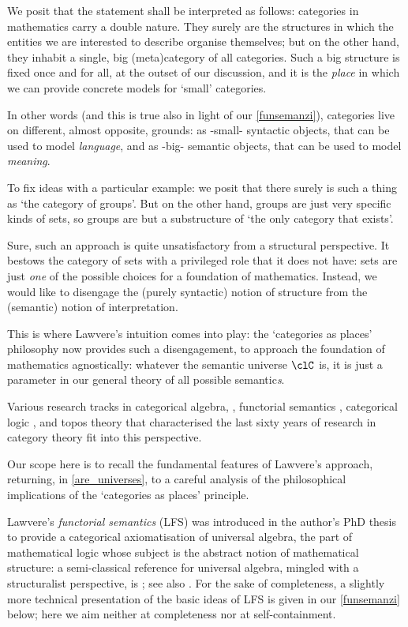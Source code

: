 We posit that the statement shall be interpreted as follows: categories in mathematics carry a double nature. They surely are the structures in which the entities we are interested to describe organise themselves; but on the other hand, they inhabit a single, big (meta)category of all categories. Such a big structure is fixed once and for all, at the outset of our discussion, and it is the \emph{place} in which we can provide concrete models for `small' categories.

In other words (and this is true also in light of our \autoref{funsemanzi}), categories live on different, almost opposite, grounds: as -small- syntactic objects, that can be used to model \emph{language}, and as -big- semantic objects, that can be used to model \emph{meaning}.

To fix ideas with a particular example: we posit that there surely is such a thing as `the category of groups'. But on the other hand, groups are just very specific kinds of sets, so groups are but a substructure of `the only category that exists'.

Sure, such an approach is quite unsatisfactory from a structural perspective. It bestows the category of sets with a privileged role that it does not have: sets are just \emph{one} of the possible choices for a foundation of mathematics. Instead, we would like to disengage the (purely syntactic) notion of structure from the (semantic) notion of interpretation.

This is where Lawvere's intuition comes into play: the `categories as places' philosophy now provides such a disengagement, to approach the foundation of mathematics agnostically: whatever the semantic universe $\clC$ is, it is just a parameter in our general theory of all possible semantic\emph{s}.

Various research tracks in categorical algebra, \cite{Janelidze2004}, functorial semantics \cite{lawvere1963functorial,hyland2007category}, categorical logic \cite{lambek1988introduction}, and topos theory \cite{JohnstonePT} that characterised the last sixty years of research in category theory fit into this perspective.

Our scope here is to recall the fundamental features of Lawvere's approach, returning, in \autoref{are_universes}, to a careful analysis of the philosophical implications of the `categories as places' principle.

Lawvere's \emph{functorial semantics} (LFS) was introduced in the author's PhD thesis \cite{lawvere1963functorial} to provide a categorical axiomatisation of universal algebra, the part of mathematical logic whose subject is the abstract notion of mathematical structure: a semi-classical reference for universal algebra, mingled with a structuralist perspective, is \cite{manes2012algebraic}; see also \cite{sankappanavar}. For the sake of completeness, a slightly more technical presentation of the basic ideas of LFS is given in our \autoref{funsemanzi} below; here we aim neither at completeness nor at self-containment.

